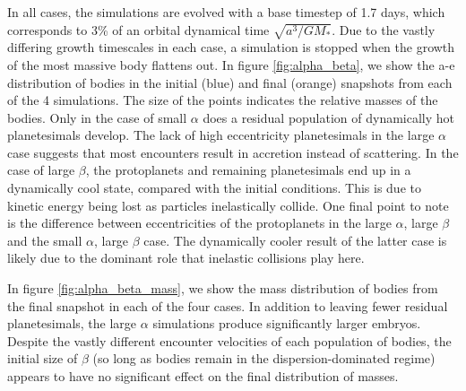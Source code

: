 \documentclass[twocolumn]{aastex63}
\begin{document}
In all cases, the simulations are evolved with a base timestep of 1.7
days, which corresponds to 3\% of an orbital dynamical time
$\sqrt{a^3/G M_{*}}$. Due to the vastly differing growth timescales in
each case, a simulation is stopped when the growth of the most massive
body flattens out. In figure \ref{fig:alpha_beta}, we show the a-e
distribution of bodies in the initial (blue) and final (orange)
snapshots from each of the 4 simulations. The size of the points
indicates the relative masses of the bodies. Only in the case of small
$\alpha$ does a residual population of dynamically hot planetesimals
develop. The lack of high eccentricity planetesimals in the large
$\alpha$ case suggests that most encounters result in accretion
instead of scattering. In the case of large $\beta$, the protoplanets
and remaining planetesimals end up in a dynamically cool state,
compared with the initial conditions. This is due to kinetic energy 
being lost as particles inelastically collide. One final point to note 
is the difference between eccentricities of the protoplanets in the 
large $\alpha$, large $\beta$ and the small $\alpha$,
large $\beta$ case. The dynamically cooler result of the latter case
is likely due to the dominant role that inelastic collisions play here.

In figure \ref{fig:alpha_beta_mass}, we show the mass distribution of bodies from the final snapshot in each of the four cases. In addition to leaving fewer residual planetesimals, the large $\alpha$ simulations produce significantly larger embryos. Despite the vastly different encounter velocities of each population of bodies, the initial size of $\beta$ (so long as bodies remain in the dispersion-dominated regime) appears to have no significant effect on the final distribution of masses.
\end{document}
